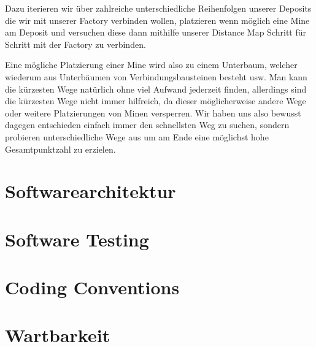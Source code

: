 \documentclass[12pt,a4paper]{article}
\begin{document}
Dazu iterieren wir über zahlreiche unterschiedliche Reihenfolgen unserer Deposits die wir mit unserer Factory verbinden wollen, platzieren wenn möglich eine Mine am Deposit und versuchen diese dann mithilfe unserer Distance Map Schritt für Schritt mit der Factory zu verbinden.

Eine mögliche Platzierung einer Mine wird also zu einem Unterbaum, welcher wiederum aus Unterbäumen von Verbindungsbausteinen besteht usw. Man kann die kürzesten Wege natürlich ohne viel Aufwand jederzeit finden, allerdings sind die kürzesten Wege nicht immer hilfreich, da dieser möglicherweise andere Wege oder weitere Platzierungen von Minen versperren. Wir haben uns also bewusst dagegen entschieden einfach immer den schnellsten Weg zu suchen, sondern probieren unterschiedliche Wege aus um am Ende eine möglichst hohe Gesamtpunktzahl zu erzielen.




\newpage

\section{Softwarearchitektur}

\section{Software Testing}

\section{Coding Conventions}

\section{Wartbarkeit}
\end{document}
